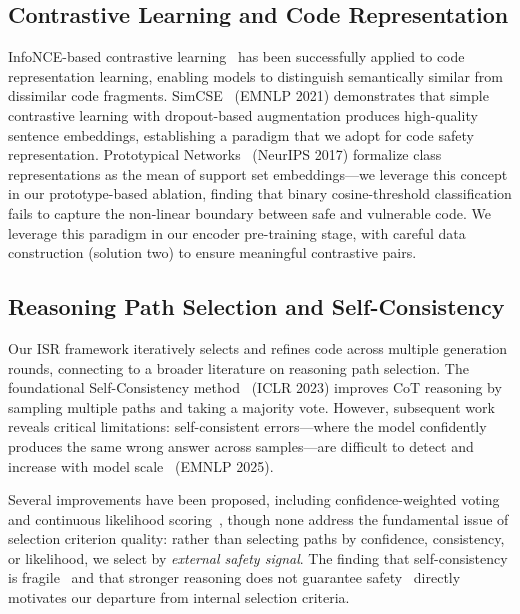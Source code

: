 \documentclass[10pt,conference]{IEEEtran}
\begin{document}
\subsection{Contrastive Learning and Code Representation}

InfoNCE-based contrastive learning~\cite{infonce} has been successfully applied to code representation learning, enabling models to distinguish semantically similar from dissimilar code fragments. SimCSE~\cite{simcse} (EMNLP 2021) demonstrates that simple contrastive learning with dropout-based augmentation produces high-quality sentence embeddings, establishing a paradigm that we adopt for code safety representation. Prototypical Networks~\cite{protonet} (NeurIPS 2017) formalize class representations as the mean of support set embeddings---we leverage this concept in our prototype-based ablation, finding that binary cosine-threshold classification fails to capture the non-linear boundary between safe and vulnerable code. We leverage this paradigm in our encoder pre-training stage, with careful data construction (solution two) to ensure meaningful contrastive pairs.

\subsection{Reasoning Path Selection and Self-Consistency}

Our ISR framework iteratively selects and refines code across multiple generation rounds, connecting to a broader literature on reasoning path selection. The foundational Self-Consistency method~\cite{selfconsistency} (ICLR 2023) improves CoT reasoning by sampling multiple paths and taking a majority vote. However, subsequent work reveals critical limitations: self-consistent errors---where the model confidently produces the same wrong answer across samples---are difficult to detect and increase with model scale~\cite{tooconsistent} (EMNLP 2025).

Several improvements have been proposed, including confidence-weighted voting~\cite{cisc} and continuous likelihood scoring~\cite{softsc}, though none address the fundamental issue of selection criterion quality: rather than selecting paths by confidence, consistency, or likelihood, we select by \textit{external safety signal}. The finding that self-consistency is fragile~\cite{tooconsistent} and that stronger reasoning does not guarantee safety~\cite{safechain,lrmsafety} directly motivates our departure from internal selection criteria.
\end{document}
